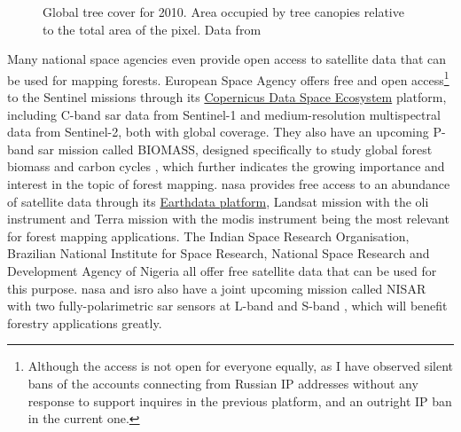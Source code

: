 \begin{figure}
\caption[Global tree cover map]{\label{fig-forest-coverage}Global tree cover for 2010. Area occupied by tree canopies relative to the total area of the pixel. Data from \citet{hansenHighResolutionGlobalMaps2013}
}
\end{figure}

Many national space agencies even provide open access to satellite data that can be used for mapping forests.
European Space Agency offers free and open access\footnote{Although the access is not open for everyone equally, as I have observed silent bans of the accounts connecting from Russian IP addresses without any response to support inquires in the previous platform, and an outright IP ban in the current one.} to the Sentinel missions through its \href{https://dataspace.copernicus.eu/}{Copernicus Data Space Ecosystem} platform, including C-band \gls{sar} data from Sentinel-1 and medium-resolution multispectral data from Sentinel-2, both with global coverage.
They also have an upcoming P-band \gls{sar} mission called BIOMASS, designed specifically to study global forest biomass and carbon cycles \citep{queganEuropeanSpaceAgency2019}, which further indicates the growing importance and interest in the topic of forest mapping.
\gls{nasa} provides free access to an abundance of satellite data through its \href{https://www.earthdata.nasa.gov/}{Earthdata platform}, Landsat mission with the \gls{oli} instrument and Terra mission with the \gls{modis} instrument being the most relevant for forest mapping applications.
The Indian Space Research Organisation, Brazilian National Institute for Space Research, National Space Research and Development Agency of Nigeria all offer free satellite data that can be used for this purpose.
\gls{nasa} and \gls{isro} also have a joint upcoming mission called NISAR with two fully-polarimetric \gls{sar} sensors at L-band and S-band \citep{kelloggNASAISROSyntheticAperture2020}, which will benefit forestry applications greatly.

